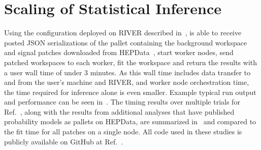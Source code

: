 \section{Scaling of Statistical Inference}\label{sec:results}
%
Using the \funcX{} configuration deployed on RIVER described in~, \funcX{} is able to receive posted JSON serializations of the \pyhf{} pallet containing the background workspace and signal patches downloaded from HEPData~\cite{ATLAS_SUSY_1Lbb_pallet}, start \funcX{} worker nodes, send patched workspaces to each worker, fit the workspace and return the results with a user wall time of under 3 minutes.
As this wall time includes data transfer to and from the user's machine and RIVER, and worker node orchestration time, the time required for inference alone is even smaller.
Example typical run output and performance can be seen in~.
The timing results over multiple trials for Ref.~\cite{ATLAS_SUSY_1Lbb_pallet}, along with the results from additional analyses that have published probability models as \pyhf{} pallets on HEPData, are summarized in~ and compared to the fit time for all patches on a single node.
All code used in these studies is publicly available on GitHub at Ref.~\cite{study_code}.


